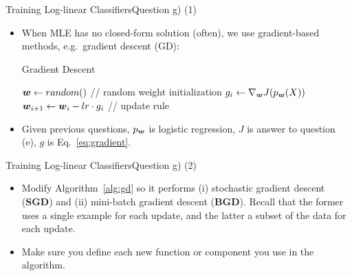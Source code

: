 \documentclass[t]{beamer}
\begin{document}
\begin{frame}{Training Log-linear Classifiers}{Question g) (1)}
    \begin{itemize}
        \item When MLE has no closed-form solution (often), we use
              gradient-based methods, e.g.\ gradient descent (GD):
              {\small
              \begin{algorithm}[H]
                  \caption{Gradient Descent}
                  \label{alg:gd}
                  \begin{algorithmic}[1]
                      \State ${\boldsymbol{w}}\leftarrow random()$ \qquad   // random weight initialization
                      \State $g_i\leftarrow \nabla_{{\boldsymbol{w}}}J(p_{{\boldsymbol{w}}}(X))$
                      \State ${\boldsymbol{w}}_{i+1}\leftarrow {\boldsymbol{w}}_i - lr \cdot g_i$ \qquad   // update rule
                      \EndFor
                      \EndProcedure
                  \end{algorithmic}
              \end{algorithm}
              }
        \item Given previous questions, $p_{{\boldsymbol{w}}}$ is logistic regression, $J$ is
              answer to question (e), $g$ is Eq.~\ref{eq:gradient}.
    \end{itemize}
\end{frame}

\begin{frame}{Training Log-linear Classifiers}{Question g) (2)}
    \begin{itemize}
        \item Modify Algorithm~\ref{alg:gd} so it performs (i) stochastic
              gradient descent (\textbf{SGD}) and (ii) mini-batch gradient
              descent (\textbf{BGD}).
              Recall that the former uses a single example for each update, and
              the latter a subset of the data for each update.
        \item Make sure you define each new function or component you use in the
              algorithm.
    \end{itemize}
\end{frame}
\end{document}
